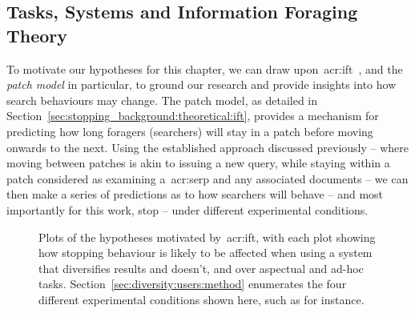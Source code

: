 \subsection{Tasks, Systems and Information Foraging Theory}\label{sec:diversity:background:tasks}
To motivate our hypotheses for this chapter, we can draw upon~\gls{acr:ift}~\citep{pirolli1999ift}, and the \emph{patch model} in particular, to ground our research and provide insights into how search behaviours may change. The patch model, as detailed in Section~\ref{sec:stopping_background:theoretical:ift}, provides a mechanism for predicting how long foragers (searchers) will stay in a patch before moving onwards to the next. Using the established approach discussed previously -- where moving between patches is akin to issuing a new query, while staying within a patch considered as examining a~\gls{acr:serp} and any associated documents -- we can then make a series of predictions as to how searchers will behave -- and most importantly for this work, stop -- under different experimental conditions.

\begin{figure}[t!]
    \centering
    \caption[\gls{acr:ift} and diversification: hypothesis plots]{Plots of the hypotheses motivated by~\gls{acr:ift}, with each plot showing how stopping behaviour is likely to be affected when using a system that  diversifies results and  doesn't, and over  aspectual and  ad-hoc tasks. Section~\ref{sec:diversity:users:method} enumerates the four different experimental conditions shown here, such as  for instance.}
    \label{fig:ift_theory}
\end{figure}


